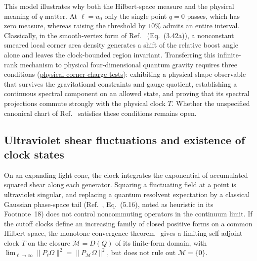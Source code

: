 \documentclass[10pt,a4paper]{article}
\numberwithin{equation}{section}
\newcommand{\repo}[2]{\href{https://github.com/sprajs/quantum-gravity/blob/main/#1}{#2}}
\begin{document}
This model illustrates why both the Hilbert-space measure and the physical meaning of $q$ matter.
At $\ell=u_0$ only the single point $q=0$ passes, which has zero measure, whereas raising the threshold by $10\%$ admits an entire interval.
Classically, in the smooth-vertex form of Ref.~\cite{Chandrasekaran2026} (Eq.~(3.42a)), a nonconstant smeared local corner area density generates a shift of the relative boost angle alone and leaves the clock-bounded region invariant.
Transferring this infinite-rank mechanism to physical four-dimensional quantum gravity requires three conditions (\repo{audit/finite-kinematics.md}{physical corner-charge tests}): exhibiting a physical shape observable that survives the gravitational constraints and gauge quotient, establishing a continuous spectral component on an allowed state, and proving that its spectral projections commute strongly with the physical clock $T$.
Whether the unspecified canonical chart of Ref.~\cite{Chandrasekaran2026} satisfies these conditions remains open.

\subsection{Ultraviolet shear fluctuations and existence of clock states}

On an expanding light cone, the clock integrates the exponential of accumulated squared shear along each generator.
Squaring a fluctuating field at a point is ultraviolet singular, and replacing a quantum resolvent expectation by a classical Gaussian phase-space tail (Ref.~\cite{Chandrasekaran2026}, Eq.~(5.16), noted as heuristic in its Footnote~18) does not control noncommuting operators in the continuum limit.
If the cutoff clocks define an increasing family of closed positive forms on a common Hilbert space, the monotone convergence theorem~\cite{Behrndt2010} gives a limiting self-adjoint clock $T$ on the closure $\mathcal{M}=\overline{D(Q)}$ of its finite-form domain, with $\lim_{\ell\to\infty}\|P_\ell\Omega\|^2=\|P_{\mathcal{M}}\Omega\|^2$, but does not rule out $\mathcal{M}=\{0\}$.
\end{document}
